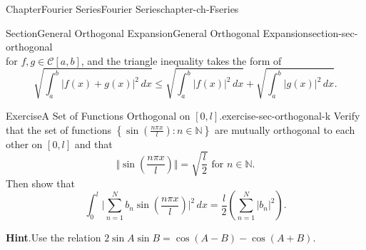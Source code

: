 \documentclass[oneside,10pt,]{book}
\newcommand{\blocktitlefont}{\relax}
\numberwithin{equation}{section}
\newcommand{\cC}{\mathcal{C}}
\begin{document}
\begin{chapterptx}{Chapter}{Fourier Series}{}{Fourier Series}{}{}{chapter-ch-Fseries}
\begin{sectionptx}{Section}{General Orthogonal Expansion}{}{General Orthogonal Expansion}{}{}{section-sec-orthogonal}
\begin{equation*}
\end{equation*}
for \(f, g\in \cC[a, b]\), and the triangle inequality takes the form of%
\begin{equation*}
\sqrt{ \int_{a}^{b} |f(x)+g(x)|^{2}\, dx} \le \sqrt{ \int_{a}^{b} |f(x)|^{2}\, dx} + \sqrt{ \int_{a}^{b} |g(x)|^{2}\, dx}.
\end{equation*}
%
\begin{inlineexercise}{Exercise}{A Set of Functions Orthogonal on \([0, l]\).}{exercise-sec-orthogonal-k}%
Verify that the set of functions \(\left\{  \sin \left(\frac{n \pi x}{l}\right): n\in\mathbb N\right\}\) are mutually orthogonal to each other on \([0, l]\) and that%
\begin{equation*}
\Vert \sin \left(\frac{n \pi x}{l}\right)\Vert = \sqrt{\frac l2} \text{ for 
$n\in\mathbb N$.}
\end{equation*}
Then show that%
\begin{equation*}
\int_{0}^{l} \vert \sum_{n=1}^{N}b_{n} \sin \left(\frac{n \pi x}{l}\right)\vert^{2} \, dx
=\frac l2 \left( \sum_{n=1}^{N} |b_{n}|^{2} \right).
\end{equation*}
\par\smallskip%
\noindent\textbf{\blocktitlefont Hint}.\hypertarget{hint-sec-orthogonal-k-c}{}\quad{}Use the relation \(2\sin A \sin B=\cos(A-B)-\cos(A+B)\).\end{inlineexercise}%
\end{sectionptx}
\end{chapterptx}
\end{document}
